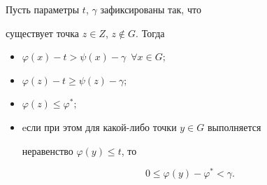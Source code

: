 \begin{lem}


Пусть параметры $t$, $\gamma$ зафиксированы так, что


существует точка $z \in Z$, $z \notin G$. Тогда


\begin{itemize}


\item[1.] $\varphi (x)-t>\psi (x)-\gamma$\, $\forall x \in G;$


\item[2.] $\varphi (z)-t \ge \psi (z)-\gamma;$


\item[3.] $\varphi (z) \le \varphi^*;$


\item[4.] eсли при этом для какой-либо точки $y \in G$ выполняется


неравенство $ \varphi (y) \le t$, то


\begin{equation}


\label{first}


0 \le \varphi (y)-\varphi^*<\gamma.


\end{equation}


\end{itemize}


\end{lem}





